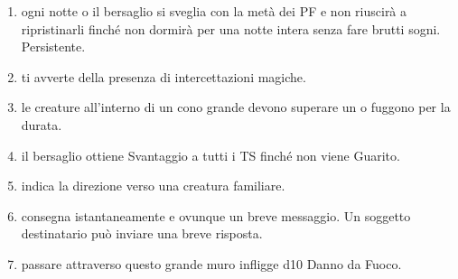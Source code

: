 \documentclass[itdr]{subfiles}
\begin{document}
\begin{enumerate}
	\item {}  ogni notte o il bersaglio si sveglia con la metà dei PF e non riuscirà a ripristinarli finché non dormirà per una notte intera senza fare brutti sogni. Persistente.
	\item {} ti avverte della presenza di intercettazioni magiche.
	\item {} le creature all'interno di un cono grande devono superare un  o fuggono per la durata.
	\item {} il bersaglio ottiene Svantaggio a tutti i TS finché non viene Guarito.
	\item {} indica la direzione verso una creatura familiare.
	\item {} consegna istantaneamente e ovunque un breve messaggio. Un soggetto destinatario può inviare una breve \mbox{risposta}.
	\item {} passare attraverso questo grande muro infligge d10 Danno da Fuoco.

\vfill
\break


\end{enumerate}
\end{document}
